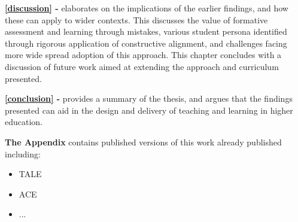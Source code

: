 
\textbf{\cref{discussion} - } elaborates on the implications of the earlier findings, and how these can apply to wider contexts. This discusses the value of formative assessment and learning through mistakes, various student persona identified through rigorous application of constructive alignment, and challenges facing more wide spread adoption of this approach. This chapter concludes with a discussion of future work aimed at extending the approach and curriculum presented.

\textbf{\cref{conclusion} - } provides a summary of the thesis, and argues that the findings presented can aid in the design and delivery of teaching and learning in higher education. 

\textbf{The Appendix} contains published versions of this work already published including:
\begin{itemize}
	\item TALE
	\item ACE
	\item ...
\end{itemize}




